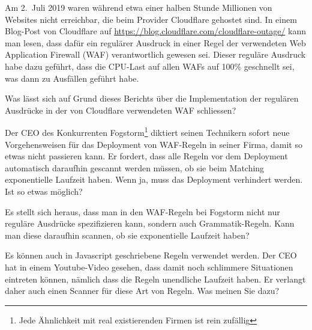 Am 2.~Juli 2019 waren während etwa einer halben Stunde Millionen von
Websites nicht erreichbar, die beim Provider Cloudflare gehostet sind.
In einem Blog-Post von Cloudflare auf
\url{https://blog.cloudflare.com/cloudflare-outage/} kann man
lesen, dass dafür ein regulärer Ausdruck in einer Regel der verwendeten
Web Application Firewall (WAF) verantwortlich gewesen sei.
Dieser reguläre Ausdruck habe dazu geführt, dass die CPU-Last auf allen
WAFs auf 100\% geschnellt sei, was dann zu Ausfällen geführt habe.

\begin{teilaufgaben}
\item
Was lässt sich auf Grund dieses Berichts über die Implementation der
regulären Ausdrücke in der von Cloudflare verwendeten WAF schliessen?
\item
Der CEO des Konkurrenten Fogstorm\footnote{Jede Ähnlichkeit mit real 
existierenden Firmen ist rein zufällig} diktiert seinen Technikern
sofort neue Vorgehensweisen für das Deployment von WAF-Regeln in seiner
Firma, damit so etwas nicht passieren kann.
Er fordert, dass alle Regeln vor dem Deployment automatisch daraufhin
gescannt werden müssen, ob sie beim Matching exponentielle Laufzeit haben.
Wenn ja, muss das Deployment verhindert werden.
Ist so etwas möglich?
\item
Es stellt sich heraus, dass man in den WAF-Regeln bei Fogstorm
nicht nur reguläre Ausdrücke spezifizieren kann, sondern auch
Grammatik-Regeln.
Kann man diese daraufhin scannen, ob sie exponentielle Laufzeit haben?
\item
Es können auch in Javascript geschriebene Regeln verwendet werden.
Der CEO hat in einem Youtube-Video gesehen, dass damit noch schlimmere
Situationen eintreten können, nämlich dass die Regeln unendliche Laufzeit
haben.
Er verlangt daher auch einen Scanner für diese Art von Regeln.
Was meinen Sie dazu?
\end{teilaufgaben}


